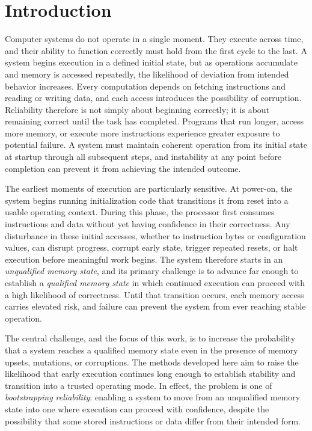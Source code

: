 \chapter{Introduction}
\label{chap:intro}

Computer systems do not operate in a single moment. They execute across time, and their ability to function correctly must hold from the first cycle to the last. A system begins execution in a defined initial state, but as operations accumulate and memory is accessed repeatedly, the likelihood of deviation from intended behavior increases. Every computation depends on fetching instructions and reading or writing data, and each access introduces the possibility of corruption. Reliability therefore is not simply about beginning correctly; it is about remaining correct until the task has completed. Programs that run longer, access more memory, or execute more instructions experience greater exposure to potential failure. A system must maintain coherent operation from its initial state at startup through all subsequent steps, and instability at any point before completion can prevent it from achieving the intended outcome.

The earliest moments of execution are particularly sensitive. At power-on, the system begins running initialization code that transitions it from reset into a usable operating context. During this phase, the processor first consumes instructions and data without yet having confidence in their correctness. Any disturbance in these initial accesses, whether to instruction bytes or configuration values, can disrupt progress, corrupt early state, trigger repeated resets, or halt execution before meaningful work begins. The system therefore starts in an \emph{unqualified memory state}, and its primary challenge is to advance far enough to establish a \emph{qualified memory state} in which continued execution can proceed with a high likelihood of correctness. Until that transition occurs, each memory access carries elevated risk, and failure can prevent the system from ever reaching stable operation.

The central challenge, and the focus of this work, is to increase the probability that a system reaches a qualified memory state even in the presence of memory upsets, mutations, or corruptions. The methods developed here aim to raise the likelihood that early execution continues long enough to establish stability and transition into a trusted operating mode. In effect, the problem is one of \emph{bootstrapping reliability}: enabling a system to move from an unqualified memory state into one where execution can proceed with confidence, despite the possibility that some stored instructions or data differ from their intended form.

